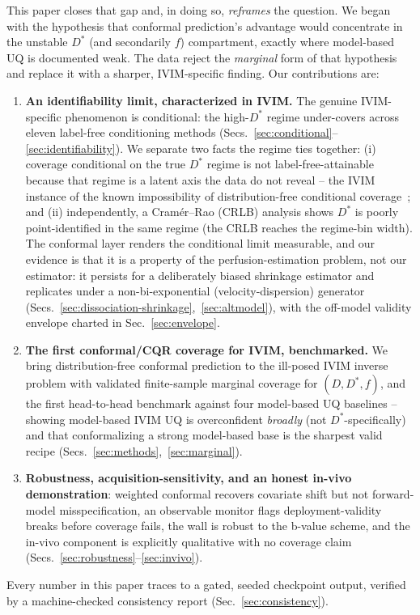 \documentclass[11pt]{article}
\newcommand{\Dstar}{D^{*}}
\begin{document}
This paper closes that gap and, in doing so, \emph{reframes} the question. We began
with the hypothesis that conformal prediction's advantage would concentrate in the
unstable $\Dstar$ (and secondarily $f$) compartment, exactly where model-based UQ
is documented weak. The data reject the \emph{marginal} form of that hypothesis and
replace it with a sharper, IVIM-specific finding. Our contributions are:
\begin{enumerate}
\item \textbf{An identifiability limit, characterized in IVIM.} The genuine
IVIM-specific phenomenon is conditional: the high-$\Dstar$ regime under-covers
across eleven label-free conditioning methods
(Secs.~\ref{sec:conditional}--\ref{sec:identifiability}). We separate two facts the
regime ties together: (i) coverage conditional on the true $\Dstar$ regime is not
label-free-attainable because that regime is a latent axis the data do not reveal --
the IVIM instance of the known impossibility of distribution-free conditional
coverage~\citep{barber2021limits}; and (ii) independently, a Cram\'er--Rao (CRLB)
analysis shows $\Dstar$ is poorly point-identified in the same regime (the CRLB
reaches the regime-bin width). The conformal layer renders the conditional limit
measurable, and our evidence is that it is a property of the perfusion-estimation
problem, not our estimator: it persists for a deliberately biased shrinkage
estimator and replicates under a non-bi-exponential (velocity-dispersion) generator
(Secs.~\ref{sec:dissociation-shrinkage},~\ref{sec:altmodel}), with the off-model
validity envelope charted in Sec.~\ref{sec:envelope}.
\item \textbf{The first conformal/CQR coverage for IVIM, benchmarked.} We bring
distribution-free conformal prediction to the ill-posed IVIM inverse problem with
validated finite-sample marginal coverage for $(D,\Dstar,f)$, and the first
head-to-head benchmark against four model-based UQ baselines -- showing model-based
IVIM UQ is overconfident \emph{broadly} (not $\Dstar$-specifically) and that
conformalizing a strong model-based base is the sharpest valid recipe
(Secs.~\ref{sec:methods},~\ref{sec:marginal}).
\item \textbf{Robustness, acquisition-sensitivity, and an honest in-vivo
demonstration}: weighted conformal recovers covariate shift but not
forward-model misspecification, an observable monitor flags deployment-validity
breaks before coverage fails, the wall is robust to the b-value scheme, and the
in-vivo component is explicitly qualitative with no coverage claim
(Secs.~\ref{sec:robustness}--\ref{sec:invivo}).
\end{enumerate}
Every number in this paper traces to a gated, seeded checkpoint output, verified by a
machine-checked consistency report (Sec.~\ref{sec:consistency}).
\end{document}
